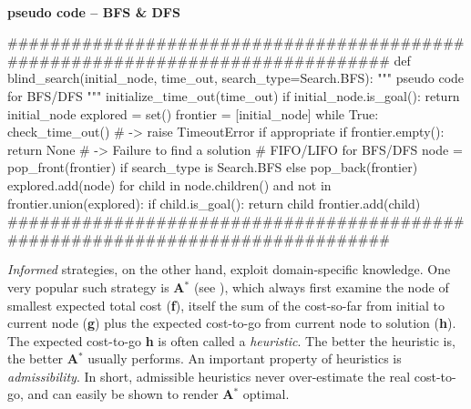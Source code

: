 \paragraph{}{\textbf{pseudo code -- BFS \& DFS}}
\begin{pseudocode}
###############################################################################
def blind_search(initial_node, time_out, search_type=Search.BFS):
   """ pseudo code for BFS/DFS """
    initialize_time_out(time_out)
    if initial_node.is_goal():
        return initial_node
    explored = set()
    frontier = [initial_node]
    while True:
        check_time_out() # -> raise TimeoutError if appropriate
        if frontier.empty():
            return None # -> Failure to find a solution
       # FIFO/LIFO for BFS/DFS
        node = pop_front(frontier) if search_type is Search.BFS else pop_back(frontier)
        explored.add(node)
        for child in node.children() and not in frontier.union(explored):
            if child.is_goal():
                return child
            frontier.add(child)
###############################################################################
\end{pseudocode}
\black
\textit{Informed} strategies, on the other hand, exploit domain-specific knowledge. One very popular such strategy is \textbf{A$^{*}$} (see \cite{DBLP:journals/jacm/DechterP85}), which always first examine the node of smallest expected total cost (\textbf{f}), itself the sum of the cost-so-far from initial to current node (\textbf{g}) plus the expected cost-to-go from current node to solution (\textbf{h}). The expected cost-to-go \textbf{h} is often called a \textit{heuristic}. The better the heuristic is, the better \textbf{A$^{*}$} usually performs. An important property of heuristics is \textit{admissibility}. In short, admissible heuristics never over-estimate the real cost-to-go, and can easily be shown to render \textbf{A$^{*}$} optimal.
\teal
